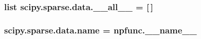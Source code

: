 \subsubsection[{\+\_\+\+\_\+all\+\_\+\+\_\+}]{\setlength{\rightskip}{0pt plus 5cm}list scipy.\+sparse.\+data.\+\_\+\+\_\+all\+\_\+\+\_\+ = \mbox{[}$\,$\mbox{]}}\label{namespacescipy_1_1sparse_1_1data_af9611781075f5399d32f20f06b874517}
\hypertarget{namespacescipy_1_1sparse_1_1data_a6cc16441add0089b6cd0328494ca7e7a}{}
\subsubsection[{name}]{\setlength{\rightskip}{0pt plus 5cm}scipy.\+sparse.\+data.\+name = npfunc.\+\_\+\+\_\+name\+\_\+\+\_\+}\label{namespacescipy_1_1sparse_1_1data_a6cc16441add0089b6cd0328494ca7e7a}
